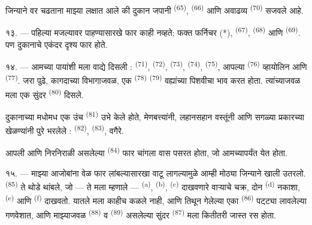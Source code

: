 जिन्याने वर चढताना माझ्या लक्षात आले की दुकान जपानी  \textsuperscript{(65)},
 \textsuperscript{(66)} आणि अवाढव्य 
\textsuperscript{(70)} सजवले आहे.

१३. --- पहिल्या मजल्यावर पाहण्यासारखे फार काही नव्हते; फक्त फर्निचर (*), 
\textsuperscript{(67)},  \textsuperscript{(68)} आणि 
\textsuperscript{(69)}. पण दुकानाचे एकंदर दृश्य फार  होते.

१४. --- आमच्या पायांशी मला वाद्ये दिसली :  \textsuperscript{(71)},
 \textsuperscript{(72)},  \textsuperscript{(73)},
 \textsuperscript{(74)},  \textsuperscript{(75)},
आपल्या  \textsuperscript{(76)} व्हायोलिन आणि 
\textsuperscript{(77)}. जरा पुढे, कागदाच्या विभागाजवळ, एक 
\textsuperscript{(78)}  \textsuperscript{(79)} वह्यांच्या पिशवीचा भाव
करत होता. त्यांच्याजवळ मला एक सुंदर  \textsuperscript{(80)} दिसले.

दुकानाच्या मधोमध एक उंच  \textsuperscript{(81)} उभे केले होते,
मेणबत्त्यांनी, लहानसहान वस्तूंनी आणि सगळ्या प्रकारच्या खेळण्यांनी पुरे भरलेले :
 \textsuperscript{(82)},  \textsuperscript{(83)}, वगैरे.

आपली  आणि निरनिराळी  असलेल्या
 \textsuperscript{(84)} फार चांगला वास पसरत होता, जो
आमच्यापर्यंत येत होता.

\VUsaut{3.4mm}
\VUsaut{2.8mm}

१५. --- माझ्या आजोबांना वेळ फार लांबल्यासारखा वाटू लागल्यामुळे आम्ही मोठ्या जिन्याने खाली
उतरलो.  \textsuperscript{(85)} ते थोडे थांबले, जो — ते
मला म्हणाले —  \textsuperscript{(a)}, 
\textsuperscript{(b)},  \textsuperscript{(c)}
 दाखवणारे वाऱ्याचे चक्र, दोन 
\textsuperscript{(d)} नकाशा,  \textsuperscript{(e)} आणि 
\textsuperscript{(f)} दाखवतो. यातले मला काहीच कळले नाही, आणि तिथून गेलेल्या एका
 \textsuperscript{(86)} पट्ट्या लावलेल्या गणवेशात, आणि
माझ्याजवळ  \textsuperscript{(88)} व
 \textsuperscript{(89)} असलेल्या सुंदर 
\textsuperscript{(87)} मला कितीतरी जास्त रस होता.

